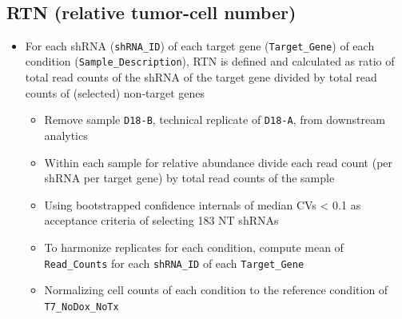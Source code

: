 \documentclass[11pt]{article}
\makeatletter
\providecommand{\tightlist}{%
      \setlength{\itemsep}{0pt}\setlength{\parskip}{0pt}}
\newcommand{\boxspacing}{\kern\kvtcb@left@rule\kern\kvtcb@boxsep}
\newcommand{\prompt}[4]{
        {\ttfamily\llap{{\color{#2}[#3]:\hspace{3pt}#4}}\vspace{-\baselineskip}}
    }
\makeatother
\begin{document}
    \begin{center}
    \end{center}
    { \hspace*{\fill} \\}
    
    \begin{tcolorbox}[breakable, size=fbox, boxrule=1pt, pad at break*=1mm,colback=cellbackground, colframe=cellborder]
\prompt{In}{incolor}{ }{\boxspacing}
\begin{Verbatim}[commandchars=\\\{\}]

\end{Verbatim}
\end{tcolorbox}

    \subsection{RTN (relative tumor-cell
number)}\label{rtn-relative-tumor-cell-number}

\begin{itemize}
\tightlist
\item
  For each shRNA (\texttt{shRNA\_ID}) of each target gene
  (\texttt{Target\_Gene}) of each condition
  (\texttt{Sample\_Description}), RTN is defined and calculated as ratio
  of total read counts of the shRNA of the target gene divided by total
  read counts of (selected) non-target genes

  \begin{itemize}
  \tightlist
  \item
    Remove sample \texttt{D18-B}, technical replicate of \texttt{D18-A},
    from downstream analytics
  \item
    Within each sample for relative abundance divide each read count
    (per shRNA per target gene) by total read counts of the sample
  \item
    Using bootstrapped confidence internals of median CVs \textless{}
    0.1 as acceptance criteria of selecting 183 NT shRNAs
  \item
    To harmonize replicates for each condition, compute mean of
    \texttt{Read\_Counts} for each \texttt{shRNA\_ID} of each
    \texttt{Target\_Gene}
  \item
    Normalizing cell counts of each condition to the reference condition
    of \texttt{T7\_NoDox\_NoTx}
  \end{itemize}
\end{itemize}
\end{document}
